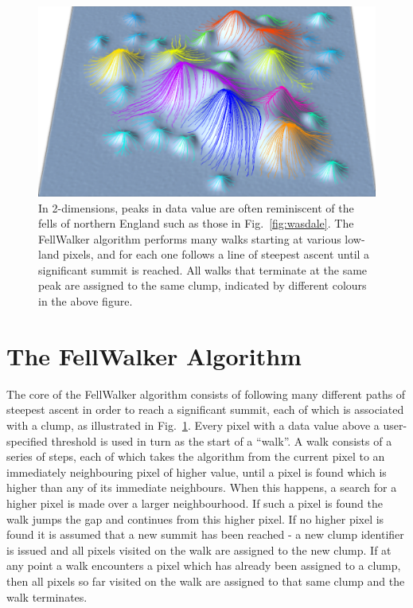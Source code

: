 \documentclass[final,authoryear,5p,times,twocolumn]{elsarticle}
\begin{document}
\begin{figure}
\includegraphics[width=\columnwidth]{fellwalking}
\caption{In 2-dimensions, peaks in data value are often reminiscent of the
fells of northern England such as those in Fig.~\ref{fig:wasdale}. The
FellWalker algorithm performs many walks starting at various low-land
pixels, and for each one follows a line of steepest ascent until a
significant summit is reached. All walks that terminate at the same peak
are assigned to the same clump, indicated by different colours in the
above figure.}
\label{fig:fellwalking}
\end{figure}

\section{The FellWalker Algorithm}

The core of the FellWalker algorithm consists of following many different
paths of steepest ascent in order to reach a significant summit, each of
which is associated with a clump, as illustrated in Fig.~\ref{fig:fellwalking}.
Every pixel with a data value above a user-specified threshold is used in
turn as the start of a ``walk''. A walk consists of a series of steps,
each of which takes the algorithm from the current pixel to an immediately
neighbouring pixel of higher value, until a pixel is found which is
higher than any of its immediate neighbours. When this happens, a search
for a higher pixel is made over a larger neighbourhood. If such a pixel
is found the walk jumps the gap and continues from this higher pixel. If no
higher pixel is found it is assumed that a new summit has been reached -
a new clump identifier is issued and all pixels visited on the walk are
assigned to the new clump. If at any point a walk encounters a pixel
which has already been assigned to a clump, then all pixels so far
visited on the walk are assigned to that same clump and the walk
terminates.
\end{document}
